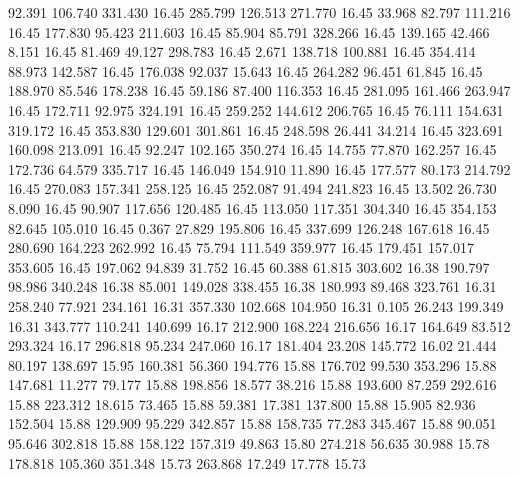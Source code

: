   92.391  106.740  331.430        16.45
 285.799  126.513  271.770        16.45
  33.968   82.797  111.216        16.45
 177.830   95.423  211.603        16.45
  85.904   85.791  328.266        16.45
 139.165   42.466    8.151        16.45
  81.469   49.127  298.783        16.45
   2.671  138.718  100.881        16.45
 354.414   88.973  142.587        16.45
 176.038   92.037   15.643        16.45
 264.282   96.451   61.845        16.45
 188.970   85.546  178.238        16.45
  59.186   87.400  116.353        16.45
 281.095  161.466  263.947        16.45
 172.711   92.975  324.191        16.45
 259.252  144.612  206.765        16.45
  76.111  154.631  319.172        16.45
 353.830  129.601  301.861        16.45
 248.598   26.441   34.214        16.45
 323.691  160.098  213.091        16.45
  92.247  102.165  350.274        16.45
  14.755   77.870  162.257        16.45
 172.736   64.579  335.717        16.45
 146.049  154.910   11.890        16.45
 177.577   80.173  214.792        16.45
 270.083  157.341  258.125        16.45
 252.087   91.494  241.823        16.45
  13.502   26.730    8.090        16.45
  90.907  117.656  120.485        16.45
 113.050  117.351  304.340        16.45
 354.153   82.645  105.010        16.45
   0.367   27.829  195.806        16.45
 337.699  126.248  167.618        16.45
 280.690  164.223  262.992        16.45
  75.794  111.549  359.977        16.45
 179.451  157.017  353.605        16.45
 197.062   94.839   31.752        16.45
  60.388   61.815  303.602        16.38
 190.797   98.986  340.248        16.38
  85.001  149.028  338.455        16.38
 180.993   89.468  323.761        16.31
 258.240   77.921  234.161        16.31
 357.330  102.668  104.950        16.31
   0.105   26.243  199.349        16.31
 343.777  110.241  140.699        16.17
 212.900  168.224  216.656        16.17
 164.649   83.512  293.324        16.17
 296.818   95.234  247.060        16.17
 181.404   23.208  145.772        16.02
  21.444   80.197  138.697        15.95
 160.381   56.360  194.776        15.88
 176.702   99.530  353.296        15.88
 147.681   11.277   79.177        15.88
 198.856   18.577   38.216        15.88
 193.600   87.259  292.616        15.88
 223.312   18.615   73.465        15.88
  59.381   17.381  137.800        15.88
  15.905   82.936  152.504        15.88
 129.909   95.229  342.857        15.88
 158.735   77.283  345.467        15.88
  90.051   95.646  302.818        15.88
 158.122  157.319   49.863        15.80
 274.218   56.635   30.988        15.78
 178.818  105.360  351.348        15.73
 263.868   17.249   17.778        15.73
